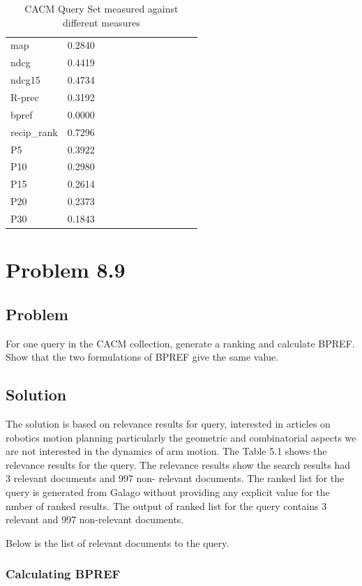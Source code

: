 \documentclass[12pt]{report}
\begin{document}
\begin{table}[]
\centering
\caption{CACM Query Set measured against different measures}
\label{my-label}
\begin{tabular}{llllllllllll}
map          &0.2840  \\
ndcg         &  0.4419     \\
ndcg15     & 0.4734  \\
R-prec      & 0.3192 \\
bpref        & 0.0000 \\
recip\_rank & 0.7296 \\
P5            & 0.3922 \\
P10          & 0.2980 \\
P15          & 0.2614 \\
P20          & 0.2373 \\
P30          & 0.1843  
\end{tabular}
\end{table}

\chapter{Problem 8.9}
\section{Problem}
For one query in the CACM collection, generate a ranking and calculate BPREF. Show that the two formulations of BPREF give the same value.
\section{Solution}
The solution is based on relevance results for query, interested in articles on robotics  motion planning particularly the geometric and combinatorial aspects we are not interested in the dynamics of arm motion. The Table 5.1 shows the relevance results for the query. The relevance results show the search results had 3 relevant documents and 997 non- relevant documents. The ranked list for the query is generated from Galago without providing any explicit value for the nmber of ranked results. The output of ranked list for the query contains 3 relevant and 997 non-relevant documents. 


Below is the list of relevant documents to the query.


\subsection{Calculating BPREF}
\end{document}
